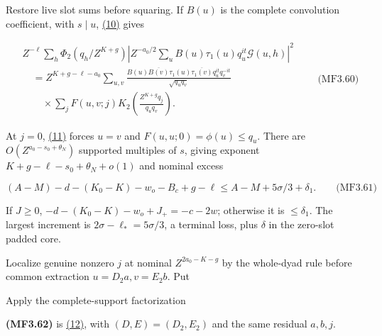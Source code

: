 Restore live slot sums before squaring. If \(B(u)\) is the complete convolution coefficient, with \(s\mid u\), \protect\hyperlink{cf:eq:A.14}{(10)} gives

\hypertarget{mf:eq:B3.60}{}

\label{mf:eq:B3.60}

\[
\begin{aligned}
&Z^{-\ell}\sum_h\Phi_2(q_h/Z^{K+g})
 \left|Z^{-a_0/2}\sum_u B(u)\tau_1(u)q_u^{it}\mathcal G(u,h)\right|^2
\\
&\quad=Z^{K+g-\ell-a_0}\sum_{u,v}
 \frac{B(u)\overline{B(v)}\tau_1(u)\overline{\tau_1(v)}q_u^{it}q_v^{-it}}
      {\sqrt{q_uq_v}}
\\
&\qquad{}\times\sum_jF(u,v;j)K_2\!\left(\frac{Z^{K+g}q_j}{q_uq_v}\right).
\end{aligned}
\qquad\text{(MF3.60)}
\]

At \(j=0\), \protect\hyperlink{cf:eq:A.15}{(11)} forces \(u=v\) and \(F(u,u;0)=\phi(u)\le q_u\). There are \(O(Z^{a_0-s_0+\theta_N})\) supported multiples of \(s\), giving exponent \(K+g-\ell-s_0+\theta_N+o(1)\) and nominal excess

\hypertarget{mf:eq:B3.61}{}

\label{mf:eq:B3.61}

\[
(A-M)-d-(K_0-K)-w_o-B_c+g-\ell
\le A-M+5\sigma/3+\delta_1.
\qquad\text{(MF3.61)}
\]

If \(J\ge0\), \(-d-(K_0-K)-w_o+J_+=-c-2w\); otherwise it is \(\le\delta_1\). The largest increment is \(2\sigma-\ell_*=5\sigma/3\), a terminal loss, plus \(\delta\) in the zero-slot padded core.

Localize genuine nonzero \(j\) at nominal \(Z^{2a_0-K-g}\) by the whole-dyad rule before common extraction \(u=D_2a,v=E_2b\). Put

\par\noindent\resizebox{\linewidth}{!}{\begin{minipage}{\dimexpr\linewidth+13.74536pt\relax}\[
c_2=\log_Zq_{D_2},\quad d_2=\log_Zq_{E_2},\quad b_2=(c_2+d_2)/2,
\quad p_2=\log_Zq_{\operatorname{rad}(D_2E_2)},\quad G_c=(D_2,E_2),\quad g_2=\log_Zq_{G_c}.
\]\end{minipage}}\par

Apply the complete-support factorization

\hypertarget{mf:eq:B3.62}{}

\label{mf:eq:B3.62}

\textbf{(MF3.62)} is \protect\hyperlink{cf:eq:A.16}{(12)}, with \((D,E)=(D_2,E_2)\) and the same residual \(a,b,j\).

